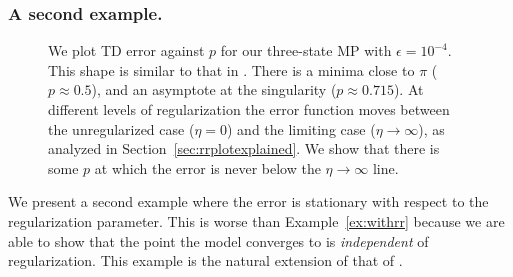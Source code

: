 \subsubsection{A second example. }
\label{sec:withrr2}

\begin{figure}
  
  \caption{We plot TD error against $p$ for our three-state MP with $\epsilon=10^{-4}$. This shape is similar to that in \cite{kolter2011fixed}. There is a minima close to $\pi$ ($p\approx 0.5$), and an asymptote at the singularity ($p\approx 0.715$). At different levels of regularization the error function moves between the unregularized case ($\eta=0$) and the limiting case ($\eta\to\infty$), as analyzed in Section~\ref{sec:rrplotexplained}. We show that there is some $p$ at which the error is never below the $\eta\to\infty$ line. }
  \label{fig:fixedpointp}
\end{figure}

We present a second example where the error is stationary with respect to the regularization parameter. This is worse than Example~\ref{ex:withrr} because we are able to show that the point the model converges to is \emph{independent} of regularization. This example is the natural extension of that of \citet{kolter2011fixed}.

